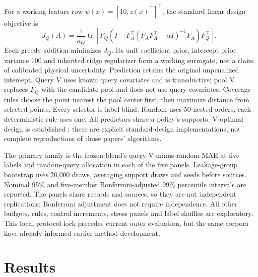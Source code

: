 \documentclass[11pt]{article}
\begin{document}
For a working feature row $\psi(x)=[10,z(x)^\top]^\top$, the standard linear design objective is
\begin{equation}
J_Q(A)=\frac{1}{n_Q}\operatorname{tr}\left[F_Q\left(I-F_A^\top(F_AF_A^\top+\alpha I)^{-1}F_A\right)F_Q^\top\right].
\label{eq:crossdesign}
\end{equation}
Each greedy addition minimizes $J_Q$. Its unit coefficient prior, intercept prior variance 100 and inherited ridge regularizer form a working surrogate, not a claim of calibrated physical uncertainty. Prediction retains the original unpenalized intercept. Query V uses known query covariates and is transductive; pool V replaces $F_Q$ with the candidate pool and does not use query covariates. Coverage rules choose the point nearest the pool center first, then maximize distance from selected points. Every selector is label-blind. Random uses 50 nested orders; each deterministic rule uses one. All predictors share a policy's supports. V-optimal design is established \cite{yubi,fontaine}; these are explicit standard-design implementations, not complete reproductions of those papers' algorithms.

The primary family is the frozen blend's query-V-minus-random MAE at five labels and random-query allocation in each of the five panels. Leakage-group bootstrap uses 20,000 draws, averaging support draws and seeds before sources. Nominal 95\% and five-member Bonferroni-adjusted 99\% percentile intervals are reported. The panels share records and sources, so they are not independent replications; Bonferroni adjustment does not require independence. All other budgets, rules, control increments, stress panels and label shuffles are exploratory. This local protocol lock precedes current outer evaluation, but the same corpora have already informed earlier method development.




\section{Results}
\end{document}
